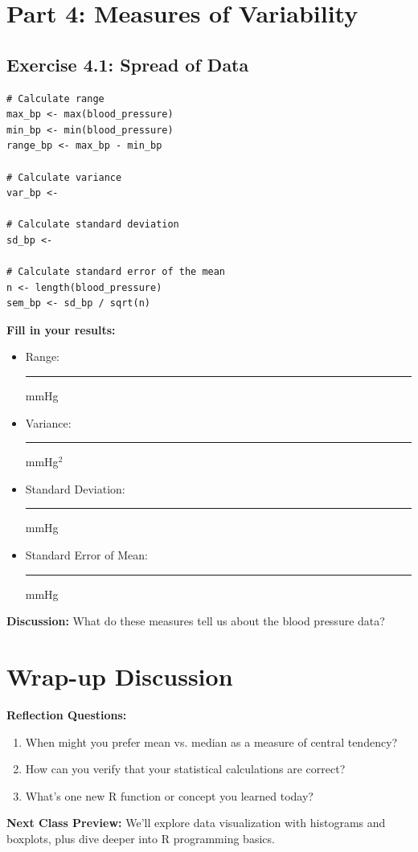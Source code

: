 \documentclass[11pt]{article}
\begin{document}
\newpage
\section{Part 4: Measures of Variability}
\subsection{Exercise 4.1: Spread of Data}
\begin{lstlisting}
# Calculate range
max_bp <- max(blood_pressure)
min_bp <- min(blood_pressure)
range_bp <- max_bp - min_bp

# Calculate variance
var_bp <-

# Calculate standard deviation
sd_bp <-

# Calculate standard error of the mean
n <- length(blood_pressure)
sem_bp <- sd_bp / sqrt(n)
\end{lstlisting}

\textbf{Fill in your results:}
\begin{itemize}
\item Range: \rule{3cm}{0.4pt} mmHg
\item Variance: \rule{3cm}{0.4pt} mmHg$^2$
\item Standard Deviation: \rule{3cm}{0.4pt} mmHg
\item Standard Error of Mean: \rule{3cm}{0.4pt} mmHg
\end{itemize}

\textbf{Discussion:} What do these measures tell us about the blood pressure data?

\section{Wrap-up Discussion}

\textbf{Reflection Questions:}
\begin{enumerate}
\item When might you prefer mean vs. median as a measure of central tendency?
\item How can you verify that your statistical calculations are correct?
\item What's one new R function or concept you learned today?
\end{enumerate}

\textbf{Next Class Preview:}
We'll explore data visualization with histograms and boxplots, plus dive deeper into R programming basics.
\end{document}

